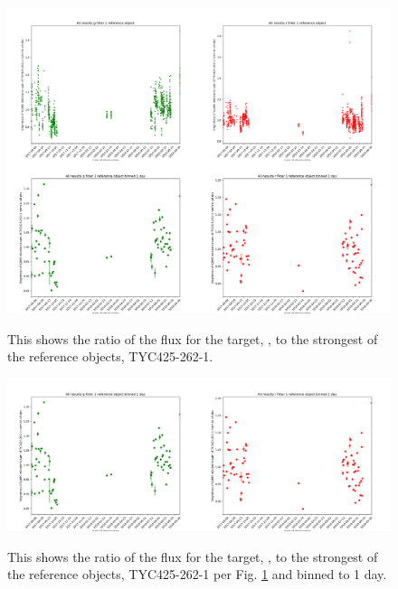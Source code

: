 \begin{figure}[!htbp]
\begin{center}
\includegraphics[scale=0.25]{images/allref1.png}
\end{center}   
\caption{This shows the ratio of the flux for the target, \bstar, to the strongest of the reference objects, TYC425-262-1.}
  \protect\label{fig:allref1}
\end{figure}

\begin{figure}[!htbp]
\begin{center}
\includegraphics[scale=0.25]{images/allref1bin.png}
\end{center}   
\caption{This shows the ratio of the flux for the target, \bstar, to the strongest of the reference objects,
  TYC425-262-1 per Fig. \ref{fig:allref1} and binned to 1 day.}
  \protect\label{fig:allref1bin}
\end{figure}

